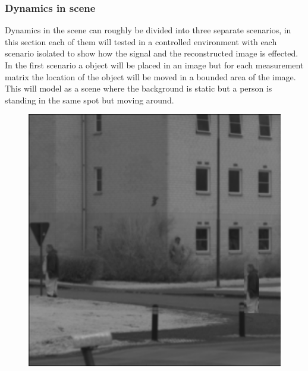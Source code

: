 \subsubsection{Dynamics in scene}
Dynamics in the scene can roughly be divided into three separate scenarios, in this section each of them will tested in a controlled environment with each scenario isolated to show how the signal and the reconstructed image is effected.\\[0.1in]

In the first scenario a object will be placed in an image but for each measurement matrix the location of the object will be moved in a bounded area of the image. This will model as a scene where the background is static but a person is standing in the same spot but moving around.

\begin{figure}[H]
    \centering
\begin{minipage}[t]{0.32\textwidth}
    \includegraphics[width=1\textwidth]{result/dynamic/local/local_whole_time_org.png}
    \label{fig:local_1}
\end{minipage}
\begin{minipage}[t]{0.32\textwidth}

\end{minipage}
\end{figure}
